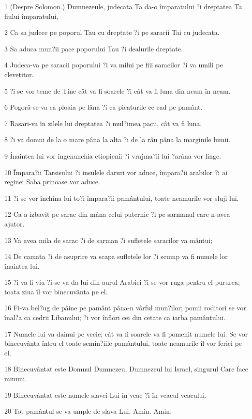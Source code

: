 \par 1 (Despre Solomon.) Dumnezeule, judecata Ta da-o împaratului ?i dreptatea Ta fiului împaratului,
\par 2 Ca sa judece pe poporul Tau cu dreptate ?i pe saracii Tai cu judecata.
\par 3 Sa aduca mun?ii pace poporului Tau ?i dealurile dreptate.
\par 4 Judeca-va pe saracii poporului ?i va milui pe fiii saracilor ?i va umili pe clevetitor.
\par 5 ?i se vor teme de Tine cât va fi soarele ?i cât va fi luna din neam în neam.
\par 6 Pogorâ-se-va ca ploaia pe lâna ?i ca picaturile ce cad pe pamânt.
\par 7 Rasari-va în zilele lui dreptatea ?i mul?imea pacii, cât va fi luna.
\par 8 ?i va domni de la o mare pâna la alta ?i de la râu pâna la marginile lumii.
\par 9 Înaintea lui vor îngenunchia etiopienii ?i vrajma?ii lui ?arâna vor linge.
\par 10 Împara?ii Tarsisului ?i insulele daruri vor aduce, împara?ii arabilor ?i ai reginei Saba prinoase vor aduce.
\par 11 ?i se vor închina lui to?i împara?ii pamântului, toate neamurile vor sluji lui.
\par 12 Ca a izbavit pe sarac din mâna celui puternic ?i pe sarmanul care n-avea ajutor.
\par 13 Va avea mila de sarac ?i de sarman ?i sufletele saracilor va mântui;
\par 14 De camata ?i de asuprire va scapa sufletele lor ?i scump va fi numele lor înaintea lui.
\par 15 ?i va fi viu ?i se va da lui din aurul Arabiei ?i se vor ruga pentru el pururea; toata ziua îl vor binecuvânta pe el.
\par 16 Fi-va bel?ug de pâine pe pamânt pâna-n vârful mun?ilor; pomii roditori se vor înal?a ca cedrii Libanului; ?i vor înflori cei din cetate ca iarba pamântului.
\par 17 Numele lui va dainui pe vecie; cât va fi soarele va fi pomenit numele lui. Se vor binecuvânta întru el toate semin?iile pamântului, toate neamurile îl vor ferici pe el.
\par 18 Binecuvântat este Domnul Dumnezeu, Dumnezeul lui Israel, singurul Care face minuni.
\par 19 Binecuvântat este numele slavei Lui în veac ?i în veacul veacului.
\par 20 Tot pamântul se va umple de slava Lui. Amin. Amin.

